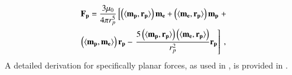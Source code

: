 \begin{multline}
   \mathbf{F_p} = {\dfrac  {3\mu _{0}}{4\pi r_{p}^{5}}}
   \left [ \left(\langle\mathbf{m_p},\mathbf{r_{p}}\rangle \right) \mathbf{m_e} + 
   \left(\langle\mathbf{m_e},\mathbf{r_{p}}\rangle\right) \mathbf{m_p} \right . +
   \\
   \left(\langle\mathbf{m_p},\mathbf{m_e}\rangle\right) \mathbf{r_{p}} - 
    \left . {\dfrac{5\left(\langle\mathbf{m_p},\mathbf{r_{p}}\rangle\right)
    \left(\langle\mathbf{m_e},\mathbf{r_{p}}\rangle\right)}{r_{p}^{2}}} \mathbf{r_{p}} \right ] \ , \label{eq:F21-dip}
\end{multline}
A detailed derivation for specifically planar forces, as used in \magpenTitle, is provided in .


